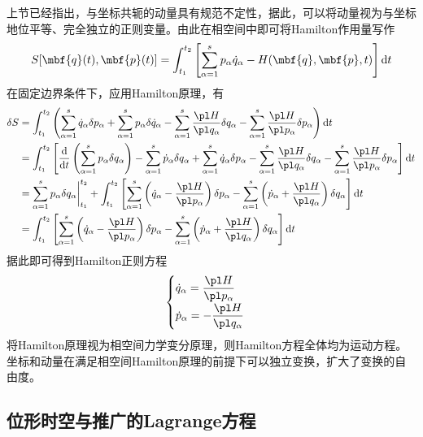 上节已经指出，与坐标共轭的动量具有规范不定性，据此，可以将动量视为与坐标地位平等、完全独立的正则变量。由此在相空间中即可将Hamilton作用量写作
\begin{equation}
	S[\mbf{q}(t),\mbf{p}(t)] = \int_{t_1}^{t_2} \left[\sum_{\alpha=1}^s p_\alpha \dot{q}_\alpha - H(\mbf{q},\mbf{p},t)\right] \mathrm{d} t
\end{equation}
在固定边界条件下，应用Hamilton原理，有
\begin{align*}
	\delta S & = \int_{t_1}^{t_2} \left(\sum_{\alpha=1}^s \dot{q}_\alpha \delta p_\alpha + \sum_{\alpha=1}^s p_\alpha \delta \dot{q}_\alpha - \sum_{\alpha=1}^s \frac{\pl H}{\pl q_\alpha} \delta q_\alpha - \sum_{\alpha=1}^s \frac{\pl H}{\pl p_\alpha} \delta p_\alpha \right) \mathrm{d} t \\
	& = \int_{t_1}^{t_2} \left[\frac{\mathrm{d}}{\mathrm{d} t} \left(\sum_{\alpha=1}^s p_\alpha \delta q_\alpha\right) - \sum_{\alpha=1}^s \dot{p}_\alpha \delta q_\alpha + \sum_{\alpha=1}^s \dot{q}_\alpha \delta p_\alpha - \sum_{\alpha=1}^s \frac{\pl H}{\pl q_\alpha} \delta q_\alpha - \sum_{\alpha=1}^s \frac{\pl H}{\pl p_\alpha} \delta p_\alpha \right] \mathrm{d} t \\
	& = \sum_{\alpha=1}^s p_\alpha \delta q_\alpha \bigg|_{t_1}^{t_2} + \int_{t_1}^{t_2} \left[\sum_{\alpha=1}^s \left(\dot{q}_\alpha - \frac{\pl H}{\pl p_\alpha}\right) \delta p_\alpha - \sum_{\alpha=1}^s \left(\dot{p}_\alpha + \frac{\pl H}{\pl q_\alpha}\right) \delta q_\alpha \right] \mathrm{d} t \\
	& = \int_{t_1}^{t_2} \left[\sum_{\alpha=1}^s \left(\dot{q}_\alpha - \frac{\pl H}{\pl p_\alpha}\right) \delta p_\alpha - \sum_{\alpha=1}^s \left(\dot{p}_\alpha + \frac{\pl H}{\pl q_\alpha}\right) \delta q_\alpha \right] \mathrm{d} t
\end{align*}
据此即可得到Hamilton正则方程
\begin{equation}
	\begin{cases}
		\dot{q}_\alpha = \dfrac{\pl H}{\pl p_\alpha} \\[1.5ex]
		\dot{p}_\alpha = -\dfrac{\pl H}{\pl q_\alpha}
	\end{cases}
\end{equation}
将Hamilton原理视为相空间力学变分原理，则Hamilton方程全体均为运动方程。坐标和动量在满足相空间Hamilton原理的前提下可以独立变换，扩大了变换的自由度。

\subsection{位形时空与推广的Lagrange方程}


